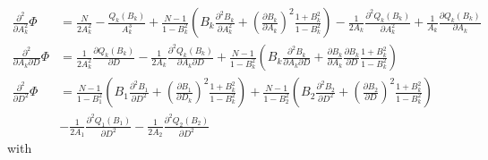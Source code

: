 \documentclass[%
 reprint,
 amsmath,amssymb,
 aps,
]{revtex4-1}
\begin{document}
\begin{equation}
	\begin{aligned}
		\frac{\partial^{2}}{\partial A_{k}^2}\Phi &= \frac{N}{2A_{k}^{2}} - \frac{Q_{k}(B_{k})}{A_{k}^{3}}
		+ \frac{N-1}{1-B_{k}^{2}}\left(B_{k}\frac{\partial^{2} B_{k}}{\partial A_{k}^{2}}
		+ \left(\frac{\partial B_{k}}{\partial A_{k}}\right)^{2}
		\frac{1+B_{k}^{2}}{1-B_{k}^{2}}\right)
		-\frac{1}{2A_{k}}\frac{\partial^{2}Q_{k}(B_{k})}{\partial A_{k}^{2}}
		+\frac{1}{A_{k}}\frac{\partial Q_{k}(B_{k})}{\partial A_{k}}\\
		\frac{\partial^{2}}{\partial A_{k}\partial D}\Phi &= \frac{1}{2A_{k}^{2}}\frac{\partial Q_{k}(B_{k})}{\partial D}
		-\frac{1}{2A_{k}}\frac{\partial^{2} Q_{k}(B_{k})}{\partial A_{k}\partial D}
		+ \frac{N-1}{1-B_{k}^{2}}\left(B_{k}\frac{\partial^{2} B_{k}}{\partial A_{k}\partial D}
		+ \frac{\partial B_{k}}{\partial A_{k}}\frac{\partial B_{k}}{\partial D}
		\frac{1+B_{k}^{2}}{1-B_{k}^{2}}
		\right)\\
		\frac{\partial^{2}}{\partial D^2}\Phi &=
		\frac{N-1}{1-B_{1}^{2}}\left(B_{1}\frac{\partial^{2} B_{1}}{\partial D^{2}}
		+ \left(\frac{\partial B_{1}}{\partial D_{k}}\right)^{2}
		\frac{1+B_{k}^{2}}{1-B_{k}^{2}}
		\right)
		+\frac{N-1}{1-B_{2}^{2}}\left(B_{2}\frac{\partial^{2} B_{2}}{\partial D^{2}}
		+ \left(\frac{\partial B_{2}}{\partial D}\right)^{2}
		\frac{1+B_{k}^{2}}{1-B_{k}^{2}}
		\right)\\
		&- \frac{1}{2A_{1}}\frac{\partial^{2}Q_{1}(B_{1})}{\partial D^{2}}
		- \frac{1}{2A_{2}}\frac{\partial^{2}Q_{2}(B_{2})}{\partial D^{2}}
	\end{aligned}
\end{equation}
with
\end{document}
